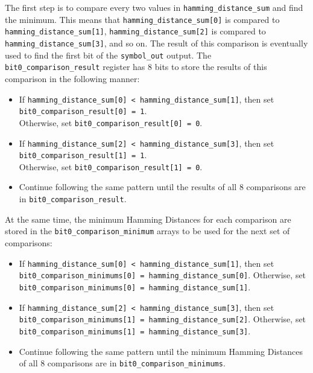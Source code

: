 The first step is to compare every two values in \texttt{hamming\_distance\_sum} and find the minimum. This means that \texttt{hamming\_distance\_sum[0]} is compared to \texttt{hamming\_distance\_sum[1]}, \texttt{hamming\_distance\_sum[2]} is compared to \texttt{hamming\-\_distance\_sum[3]}, and so on. The result of this comparison is eventually used to find the first bit of the \texttt{symbol\_out} output. The \texttt{bit0\_comparison\_result} register has 8 bits to store the results of this comparison in the following manner:

\begin{itemize}
	\item If \texttt{hamming\_distance\_sum[0] < hamming\_distance\_sum[1]}, then set\\ \texttt{bit0\_comparison\_result[0] = 1}. \\Otherwise, set \texttt{bit0\_comparison\_result[0] = 0}.
	\item If \texttt{hamming\_distance\_sum[2] < hamming\_distance\_sum[3]}, then set\\ \texttt{bit0\_comparison\_result[1] = 1}. \\Otherwise, set \texttt{bit0\_comparison\_result[1] = 0}.
	\item Continue following the same pattern until the results of all 8 comparisons are in \texttt{bit0\_comparison\_result}.
\end{itemize}

At the same time, the minimum Hamming Distances for each comparison are stored in the \texttt{bit0\_comparison\_minimum} arrays to be used for the next set of comparisons:

\begin{itemize}
	\item If \texttt{hamming\_distance\_sum[0] < hamming\_distance\_sum[1]}, then set\\ \texttt{bit0\_comparison\_minimums[0] = hamming\_distance\_sum[0]}. Otherwise, set \texttt{bit0\_comparison\_minimums[0] = hamming\_distance\_sum[1]}.
	\item If \texttt{hamming\_distance\_sum[2] < hamming\_distance\_sum[3]}, then set\\ \texttt{bit0\_comparison\_minimums[1] = hamming\_distance\_sum[2]}. Otherwise, set \texttt{bit0\_comparison\_minimums[1] = hamming\_distance\_sum[3]}.
	\item Continue following the same pattern until the minimum Hamming Distances of all 8 comparisons are in \texttt{bit0\_comparison\_minimums}.
\end{itemize}

